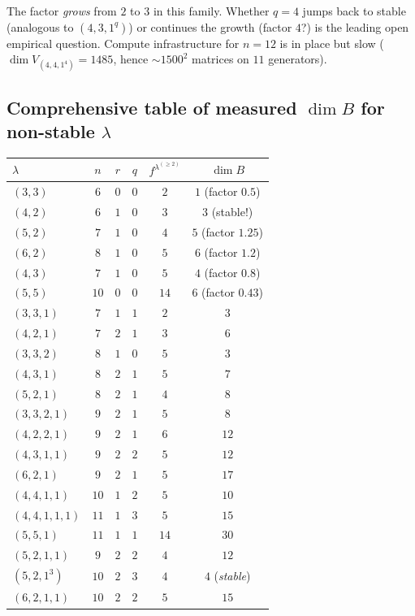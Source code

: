 \documentclass[11pt]{article}
\theoremstyle{definition}
\begin{document}
The factor \emph{grows} from $2$ to $3$ in this family.  Whether
$q = 4$ jumps back to stable (analogous to $(4, 3, 1^q)$) or continues
the growth (factor $4$?) is the leading open empirical question.
Compute infrastructure for $n = 12$ is in place but slow ($\dim
V_{(4, 4, 1^4)} = 1485$, hence $\sim 1500^2$ matrices on $11$
generators).

\subsection{Comprehensive table of measured $\dim B$ for non-stable
$\lambda$}

\begin{center}
\begin{tabular}{lccccc}
\toprule
$\lambda$ & $n$ & $r$ & $q$ & $f^{\lambda^{(\ge 2)}}$ & $\dim B$ \\
\midrule
$(3, 3)$        & $6$  & $0$ & $0$ & $2$  & $1$  (factor $0.5$) \\
$(4, 2)$        & $6$  & $1$ & $0$ & $3$  & $3$  (stable!) \\
$(5, 2)$        & $7$  & $1$ & $0$ & $4$  & $5$  (factor $1.25$) \\
$(6, 2)$        & $8$  & $1$ & $0$ & $5$  & $6$  (factor $1.2$) \\
$(4, 3)$        & $7$  & $1$ & $0$ & $5$  & $4$  (factor $0.8$) \\
$(5, 5)$        & $10$ & $0$ & $0$ & $14$ & $6$  (factor $0.43$) \\
$(3, 3, 1)$     & $7$  & $1$ & $1$ & $2$  & $3$  \\
$(4, 2, 1)$     & $7$  & $2$ & $1$ & $3$  & $6$  \\
$(3, 3, 2)$     & $8$  & $1$ & $0$ & $5$  & $3$  \\
$(4, 3, 1)$     & $8$  & $2$ & $1$ & $5$  & $7$  \\
$(5, 2, 1)$     & $8$  & $2$ & $1$ & $4$  & $8$  \\
$(3, 3, 2, 1)$  & $9$  & $2$ & $1$ & $5$  & $8$  \\
$(4, 2, 2, 1)$  & $9$  & $2$ & $1$ & $6$  & $12$ \\
$(4, 3, 1, 1)$  & $9$  & $2$ & $2$ & $5$  & $12$ \\
$(6, 2, 1)$     & $9$  & $2$ & $1$ & $5$  & $17$ \\
$(4, 4, 1, 1)$  & $10$ & $1$ & $2$ & $5$  & $10$ \\
$(4, 4, 1, 1, 1)$ & $11$ & $1$ & $3$ & $5$ & $15$ \\
$(5, 5, 1)$     & $11$ & $1$ & $1$ & $14$ & $30$ \\
$(5, 2, 1, 1)$  & $9$  & $2$ & $2$ & $4$  & $12$ \\
$(5, 2, 1^3)$   & $10$ & $2$ & $3$ & $4$  & $4$ (\emph{stable}) \\
$(6, 2, 1, 1)$  & $10$ & $2$ & $2$ & $5$  & $15$ \\
\bottomrule
\end{tabular}
\end{center}
\end{document}
